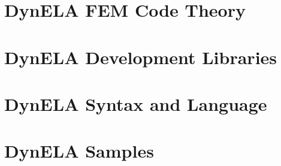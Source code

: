 \documentclass[11pt,french,english,twoside]{book}
\begin{document}


\dominitoc{}\setcounter{page}{1}

\tableofcontents

\listoffigures

\listoftables

\cleardoublepage

\renewcommand{\thepage}{\arabic{page}}\setcounter{page}{1}







\part{DynELA FEM Code Theory}



\cleardoublepage

\part{DynELA Development Libraries}













\cleardoublepage

\part{DynELA Syntax and Language}







\cleardoublepage

\part{DynELA Samples}
\end{document}
